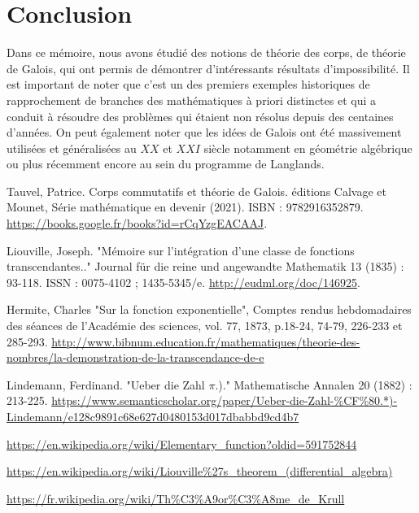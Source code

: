 \documentclass[12pt,a4paper]{report}
\begin{document}
\section{Conclusion} 
Dans ce mémoire, nous avons étudié des notions de théorie des corps, de théorie de Galois, qui ont permis de démontrer d'intéressants résultats d'impossibilité. Il est important de noter que c'est un des premiers exemples historiques de rapprochement de branches des mathématiques à priori distinctes et qui a conduit à résoudre des problèmes qui étaient non résolus depuis des centaines d'années. On peut également noter que les idées de Galois ont été massivement utilisées et généralisées au $XX$ et $XXI$ siècle notamment en géométrie algébrique ou plus récemment encore au sein du programme de Langlands. 

\begin{thebibliography}{9}

Tauvel, Patrice. Corps commutatifs et théorie de Galois. éditions Calvage et Mounet, Série mathématique en devenir (2021). ISBN : 9782916352879. \url{https://books.google.fr/books?id=rCqYzgEACAAJ}.

 Liouville, Joseph. "Mémoire sur l'intégration d'une classe de fonctions transcendantes.." Journal für die reine und angewandte Mathematik 13 (1835) : 93-118. ISSN : 0075-4102 ; 1435-5345/e. \url{http://eudml.org/doc/146925}.

 Hermite, Charles "Sur la fonction exponentielle", Comptes rendus hebdomadaires des séances de l’Académie des sciences, vol. 77, 1873, p.18-24, 74-79, 226-233 et 285-293. \url{http://www.bibnum.education.fr/mathematiques/theorie-des-nombres/la-demonstration-de-la-transcendance-de-e}

 Lindemann, Ferdinand. "Ueber die Zahl $\pi$.)." Mathematische Annalen 20 (1882) : 213-225. \url{https://www.semanticscholar.org/paper/Ueber-die-Zahl-%CF%80.*)-Lindemann/e128c9891c68e627d0480153d017dbabbd9cd4b7}

 \url{https://en.wikipedia.org/wiki/Elementary_function?oldid=591752844}

 \url{https://en.wikipedia.org/wiki/Liouville%27s_theorem_(differential_algebra)}

 \url{https://fr.wikipedia.org/wiki/Th%C3%A9or%C3%A8me_de_Krull}


\end{thebibliography} 
\end{document}
